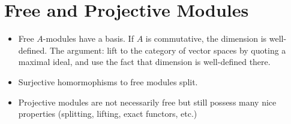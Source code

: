 \section{Free and Projective Modules}
\begin{itemize}
    \item Free $A$-modules have a basis. If $A$ is commutative, the dimension is well-defined. The argument: lift to the category of vector spaces by quoting a maximal ideal, and use the fact that dimension is well-defined there.

    \item Surjective homormophisms to free modules split.

    \item Projective modules are not necessarily free but still possess many nice properties (splitting, lifting, exact functors, etc.)
    
\end{itemize}
